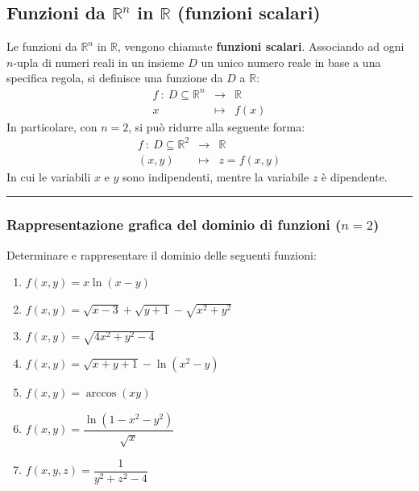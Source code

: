 \documentclass[a4paper]{article}
\newcommand{\longline}{\noindent\rule{\textwidth}{0.4pt}}
\newcommand{\definition}[1]{\textcolor{Red3}{\textbf{#1}}}
\begin{document}
	\subsection{Funzioni da \texorpdfstring{$\mathbb{R}^{n}$}{Rn} in \texorpdfstring{$\mathbb{R}$}{R} (funzioni scalari)}\label{subsection: funzioni da R^n in R (funzioni scalari)}

	Le funzioni da $\mathbb{R}^{n}$ in $\mathbb{R}$, vengono chiamate \definition{funzioni scalari}. Associando ad ogni $n$-upla di numeri reali in un insieme $D$ un unico numero reale in base a una specifica regola, si definisce una funzione da $D$ a $\mathbb{R}$:
	\begin{equation}
		\begin{array}{rcl}
			f \: : \: D \subseteq \mathbb{R}^{n} &\rightarrow& \mathbb{R} \\
			x &\mapsto& f\left(x\right)
		\end{array}
	\end{equation}
	In particolare, con $n = 2$, si può ridurre alla seguente forma:
	\begin{equation}
		\begin{array}{rcl}
			f \: : \: D \subseteq \mathbb{R}^{2} &\rightarrow& \mathbb{R} \\
			\left(x,y\right) &\mapsto& z = f\left(x,y\right)
		\end{array}
	\end{equation}
	In cui le variabili $x$ e $y$ sono indipendenti, mentre la variabile $z$ è dipendente.

	\longline

	\subsubsection{Rappresentazione grafica del dominio di funzioni (\texorpdfstring{$n = 2$}{n = 2})}\label{subsubsection: rappresentazione grafica del dominio di funzioni (n = 2)}

	Determinare e rappresentare il dominio delle seguenti funzioni:
	\begin{enumerate}
		\item $f\left(x,y\right) = x\ln\left(x-y\right)$
		\item $f\left(x,y\right) = \sqrt{x-3} + \sqrt{y+1} - \sqrt{x^{2} + y^{2}}$
		\item $f\left(x,y\right) = \sqrt{4x^{2} + y^{2} - 4}$
		\item $f\left(x,y\right) = \sqrt{x+y+1} - \ln\left(x^{2} - y\right)$
		\item $f\left(x,y\right) = \arccos\left(xy\right)$
		\item $f\left(x,y\right) = \dfrac{\ln\left(1-x^{2}-y^{2}\right)}{\sqrt{x}}$ 
		\item $f\left(x,y,z\right) = \dfrac{1}{y^{2} + z^{2} - 4}$
	\end{enumerate}\newpage
\end{document}
